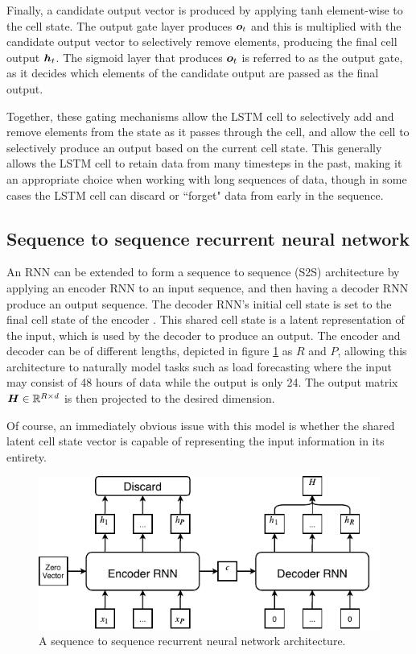 Finally, a candidate output vector is produced by applying tanh element-wise to the cell state.
The output gate layer produces ${\bm{o}}_t$ and this is multiplied with the candidate output vector to selectively remove elements, producing the final cell output ${\bm{h}}_t$.
The sigmoid layer that produces ${\bm{o}}_t$ is referred to as the output gate, as it decides which elements of the candidate output are passed as the final output.

Together, these gating mechanisms allow the LSTM cell to selectively add and remove elements from the state as it passes through the cell, and allow the cell to selectively produce an output based on the current cell state.
This generally allows the LSTM cell to retain data from many timesteps in the past, making it an appropriate choice when working with long sequences of data, though in some cases the LSTM cell can discard or ``forget" data from early in the sequence.

\subsection{Sequence to sequence recurrent neural network}
\label{section-S2S}
An RNN can be extended to form a sequence to sequence (S2S) architecture by applying an encoder RNN to an input sequence, and then having a decoder RNN produce an output sequence.
The decoder RNN's initial cell state is set to the final cell state of the encoder \cite{Cho2014a}.
This shared cell state is a latent representation of the input, which is used by the decoder to produce an output.
The encoder and decoder can be of different lengths, depicted in figure \ref{fig:S2S} as $R$ and $P$, allowing this architecture to naturally model tasks such as load forecasting where the input may consist of 48 hours of data while the output is only 24.
The output matrix ${\bm{H}} \in \mathbb{R}^{R \times d}$ is then projected to the desired dimension.

Of course, an immediately obvious issue with this model is whether the shared latent cell state vector is capable of representing the input information in its entirety.

\begin{figure}[htbp]
	\centerline{\includegraphics[trim=0 0cm 0 0, width=.75\textwidth]{images/S2S.pdf}}
	\caption{A sequence to sequence recurrent neural network architecture.}
	\label{fig:S2S}
\end{figure}

